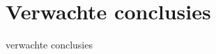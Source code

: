 \documentclass{hogent-article}
\begin{document}
\section{Verwachte conclusies}


verwachte conclusies


\printbibliography[heading=bibintoc]
\end{document}
